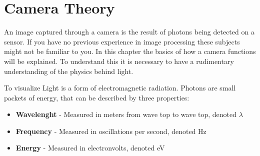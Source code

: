 \section{Camera Theory}

An image captured through a camera is the result of photons being detected on a sensor. If you have no previous experience in image processing these subjects might not be familiar to you. In this chapter the basics of how a camera functions will be explained. To understand this it is necessary to have a rudimentary understanding of the physics behind light.

To visualize Light is a form of electromagnetic radiation. Photons are small packets of energy, that can be described by three properties:



\begin{itemize}
\item \textbf{Wavelenght} - Measured in meters from wave top to wave top, denoted $\lambda$
\item \textbf{Frequency} - Measured in oscillations per second, denoted Hz
\item \textbf{Energy} - Measured in electronvolts, denoted eV
\end{itemize}
